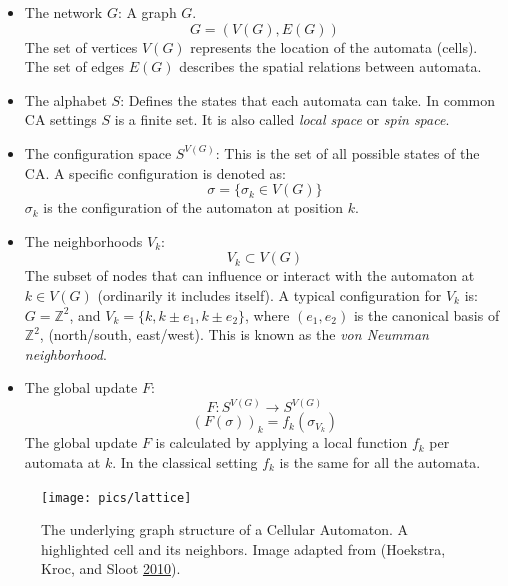 \documentclass[
  openany]{book}
\begin{document}
\begin{itemize}
\item
  The network \(G\):
  A graph \(G\).
  \[ G = (V(G), E(G)) \]
  The set of vertices \(V(G)\) represents the location of the automata (cells). The set of edges \(E(G)\) describes the spatial relations between automata.
\item
  The alphabet \(S\):
  Defines the states that each automata can take. In common CA settings \(S\) is a finite set. It is also called \emph{local space} or \emph{spin space}.
\item
  The configuration space \(S^{V(G)}\):
  This is the set of all possible states of the CA. A specific configuration is denoted as:
  \[ \sigma = \{\sigma_k \in V(G)\} \]
  \(\sigma_k\) is the configuration of the automaton at position \(k\).
\item
  The neighborhoods \(V_k\):
  \[ V_k \subset  V(G) \]
  The subset of nodes that can influence or interact with the automaton at \(k \in V(G)\) (ordinarily it includes itself). A typical configuration for \(V_k\) is: \(G = \mathds{Z}^2\), and \(V_k = \{k, k \pm e_1, k \pm e_2\}\), where \((e_1, e_2)\) is the canonical basis of \(\mathds{Z}^2\), (north/south, east/west). This is known as the \emph{von Neumman neighborhood}.
\item
  The global update \(F\):
  \[ F: S^{V(G)} \rightarrow S^{V(G)} \]
  \[ (F(\sigma))_k = f_k(\sigma_{V_k}) \]
  The global update \(F\) is calculated by applying a local function \(f_k\) per automata at \(k\). In the classical setting \(f_k\) is the same for all the automata.
\end{itemize}




\begin{figure}

{\centering \texttt{[image: pics/lattice]} 

}

\caption{The underlying graph structure of a Cellular Automaton.
A highlighted cell and its neighbors. Image adapted from (Hoekstra, Kroc, and Sloot \protect\hyperlink{ref-hoekstra2010simulating}{2010}).}\label{fig:CA-lattice}
\end{figure}
\end{document}
